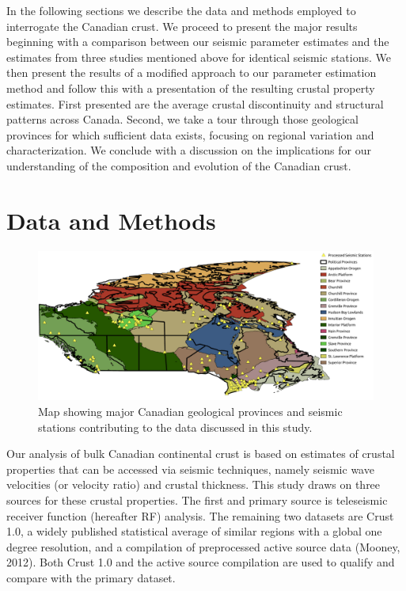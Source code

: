 \documentclass[msc,oneside]{ubcthesis}
\begin{document}
In the following sections we describe the data and methods employed to interrogate the Canadian crust. We proceed to present the major results beginning with a comparison between our seismic parameter estimates and the estimates from three studies mentioned above for identical seismic stations. We then present the results of a modified approach to our parameter estimation method and follow this with a presentation of the resulting crustal property estimates.  First presented are the average crustal discontinuity and structural patterns across Canada. Second, we take a tour through those geological provinces for which sufficient data exists, focusing on regional variation and characterization. We conclude with a discussion on the implications for our understanding of the composition and evolution of the Canadian crust.

\chapter{Data and Methods} \label{cha:datamethods}

\begin{figure}
  \centering
  \includegraphics[width=\textwidth]{stationMap.pdf}
  \caption[Seismic broadband station locations]{Map showing major Canadian geological provinces and seismic stations contributing to the data discussed in this study.}
  \label{map:stationMap}
\end{figure}


Our analysis of bulk Canadian continental crust is based on estimates of crustal properties that can be accessed via seismic techniques, namely seismic wave velocities (or velocity ratio) and crustal thickness. This study draws on three sources for these crustal properties. The first and primary source is teleseismic receiver function (hereafter RF) analysis. The remaining two datasets are Crust 1.0, a widely published statistical average of similar regions with a global one degree resolution, and a compilation of preprocessed active source data (Mooney, 2012). Both Crust 1.0 and the active source compilation are used to qualify and compare with the primary dataset.
\end{document}
